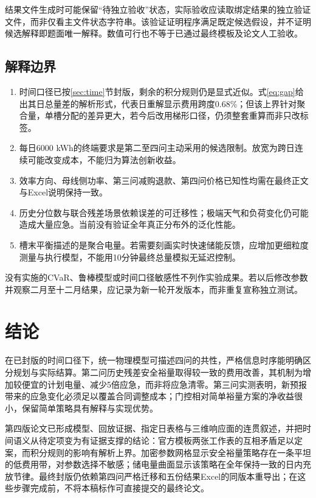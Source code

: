 \documentclass[UTF8,a4paper,zihao=-4,fontset=fandol]{ctexart}
\begin{document}
结果文件生成时可能保留“待独立验收”状态，实际验收应读取绑定结果的独立验证文件，而非仅看主文件状态字符串。该验证证明程序满足既定候选假设，并不证明候选解释即题面唯一解释。数值可行也不等于已通过最终模板及论文人工验收。

\subsection{解释边界}
\begin{enumerate}
\item 时间口径已按\ref{sec:time}节封版，剩余的积分规则仍是显式近似。式\eqref{eq:gap}给出其日总量差的解析形式，代表日重解显示费用跨度0.68\%；但该上界针对聚合量，单槽分配的差异更大，若今后改用梯形口径，仍须整套重算而非只改标签。
\item 每日6000 kWh的终端要求是第二至四问主动采用的候选限制。放宽为跨日连续可能改变成本，不能归为算法创新收益。
\item 效率方向、母线侧功率、第三问减购退款、第四问价格已知性均需在最终正文与Excel说明保持一致。
\item 历史分位数与联合残差场景依赖误差的可迁移性；极端天气和负荷变化仍可能造成大量应急。当前没有验证全年真正分布外的泛化性能。
\item 槽末平衡描述的是聚合电量。若需要刻画实时快速储能反馈，应增加更细粒度测量与执行模型，不能用10分钟最终总量模拟无延迟控制。
\end{enumerate}
没有实施的CVaR、鲁棒模型或时间口径敏感性不列作实验成果。若以后修改参数并观察二月至十二月结果，应记录为新一轮开发版本，而非重复宣称独立测试。

\section{结论}
在已封版的时间口径下，统一物理模型可描述四问的共性，严格信息时序能明确区分规划与实际结算。第二问历史残差安全裕量取得较一致的费用改善，其机制为增加较便宜的计划电量、减少5倍应急，而非将应急清零。第三问实测表明，新预报带来的应急变化必须足以覆盖合同调整成本；门控相对简单裕量方案的净收益很小，保留简单策略具有解释与实现优势。

第四版论文已形成模型、回放证据、指定日表格与三维响应面的连贯叙述，并把时间语义从待定项变为有证据支撑的结论：官方模板两张工作表的互相矛盾足以定案，而积分规则的影响有解析上界。加密参数网格显示安全裕量策略存在一条平坦的低费用带，对参数选择不敏感；储电量曲面显示该策略在全年保持一致的日内充放节律。最终封版仍依赖第四问严格迁移和五份结果Excel的同版本重导出；在这些步骤完成前，不将本稿标作可直接提交的最终论文。
\end{document}
